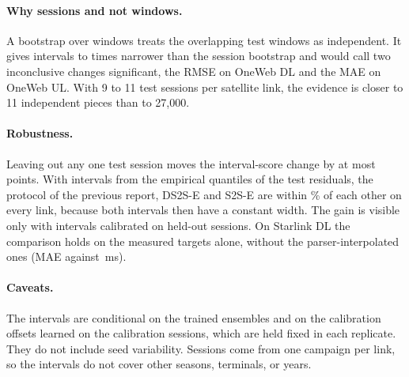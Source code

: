 \paragraph{Why sessions and not windows.} A bootstrap over windows treats the \BSnWinTot{} overlapping test windows as independent. It gives intervals \BSWidRatioLo{} to \BSWidRatioHi{} times narrower than the session bootstrap and would call two inconclusive changes significant, the RMSE on OneWeb DL and the MAE on OneWeb UL. With 9 to 11 test sessions per satellite link, the evidence is closer to 11 independent pieces than to 27{,}000.

\paragraph{Robustness.} Leaving out any one test session moves the interval-score change by at most \BSLooMax{} points. With intervals from the empirical quantiles of the test residuals, the protocol of the previous report, DS2S-E and S2S-E are within \IsProtoMaxAbs\% of each other on every link, because both intervals then have a constant width. The gain is visible only with intervals calibrated on held-out sessions. On Starlink DL the comparison holds on the measured targets alone, without the parser-interpolated ones (MAE \RealMAEFRSLDL{} against \RealMAEPrevSLDL\,ms).

\paragraph{Caveats.} The intervals are conditional on the trained ensembles and on the calibration offsets learned on the calibration sessions, which are held fixed in each replicate. They do not include seed variability. Sessions come from one campaign per link, so the intervals do not cover other seasons, terminals, or years.
